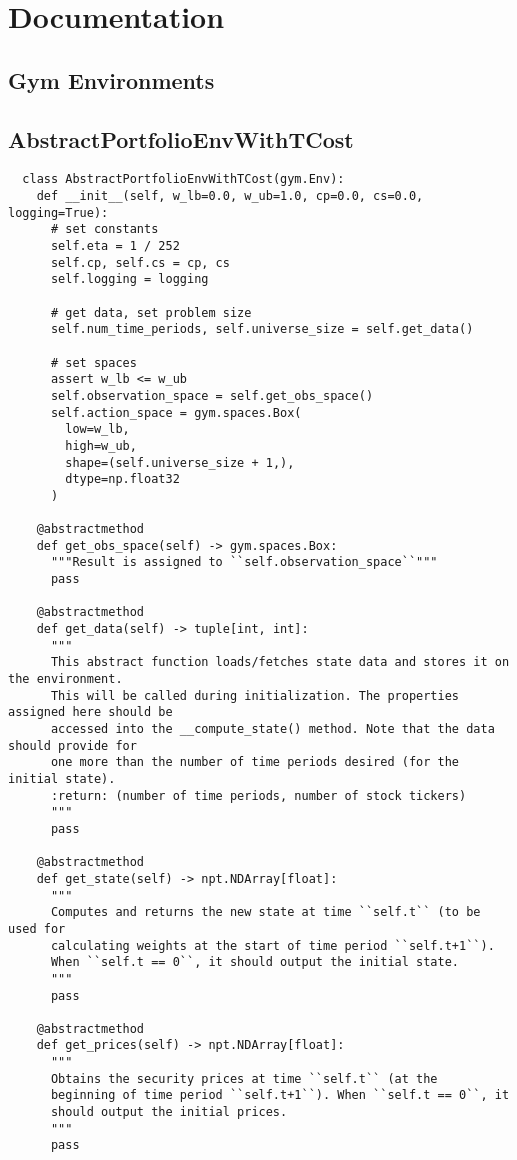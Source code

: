 \chapter{Documentation}

\section{Gym Environments}

\section{AbstractPortfolioEnvWithTCost}

\begin{verbatim}
  class AbstractPortfolioEnvWithTCost(gym.Env):
    def __init__(self, w_lb=0.0, w_ub=1.0, cp=0.0, cs=0.0, logging=True):
      # set constants
      self.eta = 1 / 252
      self.cp, self.cs = cp, cs
      self.logging = logging

      # get data, set problem size
      self.num_time_periods, self.universe_size = self.get_data()

      # set spaces
      assert w_lb <= w_ub
      self.observation_space = self.get_obs_space()
      self.action_space = gym.spaces.Box(
        low=w_lb,
        high=w_ub,
        shape=(self.universe_size + 1,),
        dtype=np.float32
      )

    @abstractmethod
    def get_obs_space(self) -> gym.spaces.Box:
      """Result is assigned to ``self.observation_space``"""
      pass

    @abstractmethod
    def get_data(self) -> tuple[int, int]:
      """
      This abstract function loads/fetches state data and stores it on the environment.
      This will be called during initialization. The properties assigned here should be
      accessed into the __compute_state() method. Note that the data should provide for
      one more than the number of time periods desired (for the initial state).
      :return: (number of time periods, number of stock tickers)
      """
      pass

    @abstractmethod
    def get_state(self) -> npt.NDArray[float]:
      """
      Computes and returns the new state at time ``self.t`` (to be used for
      calculating weights at the start of time period ``self.t+1``).
      When ``self.t == 0``, it should output the initial state.
      """
      pass

    @abstractmethod
    def get_prices(self) -> npt.NDArray[float]:
      """
      Obtains the security prices at time ``self.t`` (at the
      beginning of time period ``self.t+1``). When ``self.t == 0``, it
      should output the initial prices.
      """
      pass


\end{verbatim}
